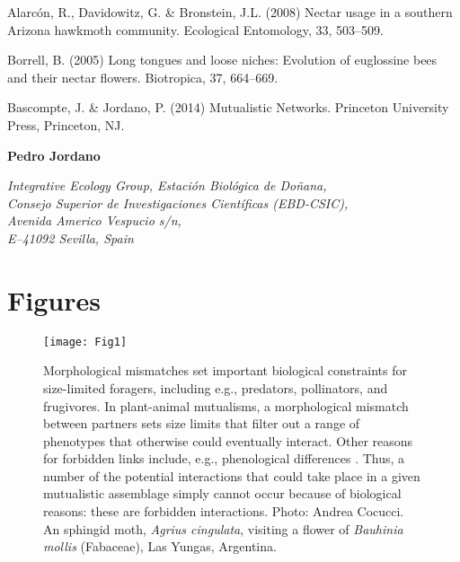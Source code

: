 \documentclass[a4paper,12pt]{article}
\begin{document}
\begin{thebibliography}{10}
Alarcón, R., Davidowitz, G. \& Bronstein, J.L. (2008) Nectar usage in a southern Arizona hawkmoth community. Ecological Entomology, 33, 503–509.

Borrell, B. (2005) Long tongues and loose niches: Evolution of euglossine bees and their nectar flowers. Biotropica, 37, 664–669.

Bascompte, J. \& Jordano, P. (2014) Mutualistic Networks. Princeton University Press, Princeton, NJ.

\end{thebibliography}


\begin{flushright}
  \noindent 
  		\textbf{Pedro Jordano }\\
  		\begin{spacing}{1.0}
		\textit{Integrative Ecology Group, Estaci\'on Biol\'ogica de Do\~nana, \\ Consejo Superior de Investigaciones Cient\'ificas (EBD-CSIC), \\ Avenida Americo Vespucio s\slash n, \\ E--41092 Sevilla, Spain}
		\end{spacing}
\end{flushright}
\newpage

\section*{Figures}


\begin{figure}[h!]
  \caption{Morphological mismatches set important biological constraints for size-limited foragers, including e.g., predators, pollinators, and frugivores. In plant-animal mutualisms, a morphological mismatch between partners sets size limits that filter out a range of phenotypes that otherwise could eventually interact. Other reasons for forbidden links include, e.g., phenological differences \citep{BasJor:2014}. Thus, a number of the potential interactions that could take place in a given mutualistic assemblage simply cannot occur because of biological reasons: these are forbidden interactions. Photo: Andrea Cocucci. An sphingid moth, \textit{Agrius cingulata}, visiting a flower of \textit{Bauhinia mollis} (Fabaceae), Las Yungas, Argentina.}
  \label{Fig1}
  \begin{center}
    \texttt{[image: Fig1]}
  \end{center}
\end{figure}
\end{document}
